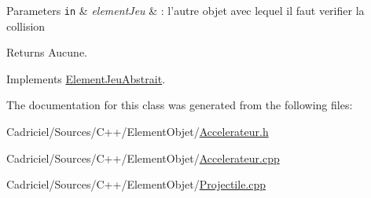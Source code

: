 \begin{DoxyParams}[1]{Parameters}
\mbox{\tt in}  & {\em element\-Jeu} & \-: l'autre objet avec lequel il faut verifier la collision\\
\hline
\end{DoxyParams}
\begin{DoxyReturn}{Returns}
Aucune. 
\end{DoxyReturn}


Implements \hyperlink{group__inf2990_gaaa60e09cf00bea42f27017e1a7a48e7b}{Element\-Jeu\-Abstrait}.



The documentation for this class was generated from the following files\-:\begin{DoxyCompactItemize}
\item 
Cadriciel/\-Sources/\-C++/\-Element\-Objet/\hyperlink{_accelerateur_8h}{Accelerateur.\-h}\item 
Cadriciel/\-Sources/\-C++/\-Element\-Objet/\hyperlink{_accelerateur_8cpp}{Accelerateur.\-cpp}\item 
Cadriciel/\-Sources/\-C++/\-Element\-Objet/\hyperlink{_projectile_8cpp}{Projectile.\-cpp}\end{DoxyCompactItemize}
